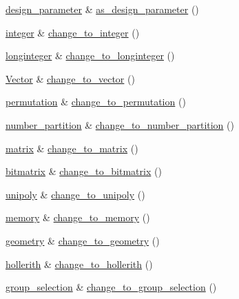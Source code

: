 \begin{DoxyCompactItemize}
\item 
\mbox{\hyperlink{classdesign__parameter}{design\+\_\+parameter}} \& \mbox{\hyperlink{classdiscreta__base_aab24ff38ea1c5471ab3de42e014d0f2a}{as\+\_\+design\+\_\+parameter}} ()
\item 
\mbox{\hyperlink{classinteger}{integer}} \& \mbox{\hyperlink{classdiscreta__base_a58a5a5bd8f8e6f2dd7b4483b66dc7bb9}{change\+\_\+to\+\_\+integer}} ()
\item 
\mbox{\hyperlink{classlonginteger}{longinteger}} \& \mbox{\hyperlink{classdiscreta__base_aa65b4b95b89b1df5ff8e0ef944e598a9}{change\+\_\+to\+\_\+longinteger}} ()
\item 
\mbox{\hyperlink{class_vector}{Vector}} \& \mbox{\hyperlink{classdiscreta__base_a66186d19c55ad54af11e2a040a763c38}{change\+\_\+to\+\_\+vector}} ()
\item 
\mbox{\hyperlink{classpermutation}{permutation}} \& \mbox{\hyperlink{classdiscreta__base_a38e11ff129ddc29d67b54520e9a0a538}{change\+\_\+to\+\_\+permutation}} ()
\item 
\mbox{\hyperlink{classnumber__partition}{number\+\_\+partition}} \& \mbox{\hyperlink{classdiscreta__base_a15be55441d3768c506bf9faabeef9b5b}{change\+\_\+to\+\_\+number\+\_\+partition}} ()
\item 
\mbox{\hyperlink{classmatrix}{matrix}} \& \mbox{\hyperlink{classdiscreta__base_a51f1aaa0764c4161c0dbd981091ca5cb}{change\+\_\+to\+\_\+matrix}} ()
\item 
\mbox{\hyperlink{classbitmatrix}{bitmatrix}} \& \mbox{\hyperlink{classdiscreta__base_adcb7fdf185f23731b42c96488599919e}{change\+\_\+to\+\_\+bitmatrix}} ()
\item 
\mbox{\hyperlink{classunipoly}{unipoly}} \& \mbox{\hyperlink{classdiscreta__base_a436a1d89a0e7a13ba1ad0ff5813c03ed}{change\+\_\+to\+\_\+unipoly}} ()
\item 
\mbox{\hyperlink{classmemory}{memory}} \& \mbox{\hyperlink{classdiscreta__base_a21a76b868e94f17a6579997f0a50a006}{change\+\_\+to\+\_\+memory}} ()
\item 
\mbox{\hyperlink{classgeometry}{geometry}} \& \mbox{\hyperlink{classdiscreta__base_a5a3efbeeb01c41259b91ed2d87bfcbb2}{change\+\_\+to\+\_\+geometry}} ()
\item 
\mbox{\hyperlink{classhollerith}{hollerith}} \& \mbox{\hyperlink{classdiscreta__base_a10f410adc814d4568e3b0f84550c4ca1}{change\+\_\+to\+\_\+hollerith}} ()
\item 
\mbox{\hyperlink{classgroup__selection}{group\+\_\+selection}} \& \mbox{\hyperlink{classdiscreta__base_a6b269515e796a08da4db719ae2dbdca9}{change\+\_\+to\+\_\+group\+\_\+selection}} ()

\end{DoxyCompactItemize}
